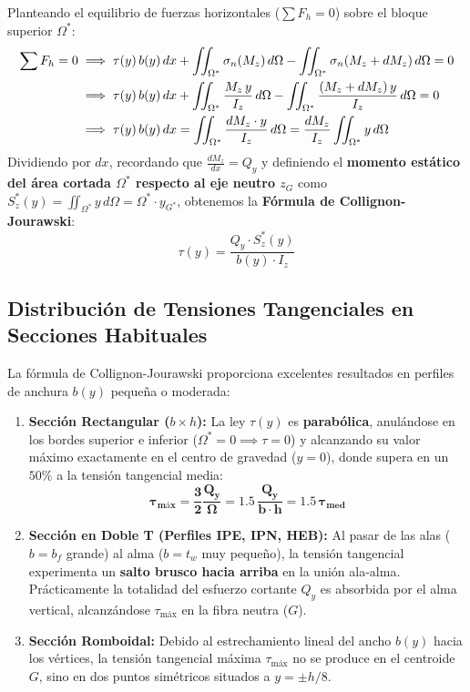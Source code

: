 Planteando el equilibrio de fuerzas horizontales ($\sum F_h = 0$) sobre el bloque superior $\Omega^*$:
\begin{align}
    \sum F_h = 0 & \implies \tau(y) \, b(y) \, dx + \iint_{\Omega^*} \sigma_n(M_z) \, d\Omega - \iint_{\Omega^*} \sigma_n(M_z + dM_z) \, d\Omega = 0 \notag                 \\
                 & \implies \tau(y) \, b(y) \, dx + \iint_{\Omega^*} \frac{M_z \, y}{I_z} \, d\Omega - \iint_{\Omega^*} \frac{(M_z + dM_z) \, y}{I_z} \, d\Omega = 0 \notag \\
                 & \implies \tau(y) \, b(y) \, dx = \iint_{\Omega^*} \frac{dM_z \cdot y}{I_z} \, d\Omega = \frac{dM_z}{I_z} \iint_{\Omega^*} y \, d\Omega
\end{align}
Dividiendo por $dx$, recordando que $\frac{dM_z}{dx} = Q_y$ y definiendo el \textbf{momento estático del área cortada $\Omega^*$ respecto al eje neutro $z_G$} como $S_z^*(y) = \iint_{\Omega^*} y \, d\Omega = \Omega^* \cdot y_{G^*}$, obtenemos la \textbf{Fórmula de Collignon-Jourawski}:
\begin{equation}
    \boxed{\tau(y) = \frac{Q_y \cdot S_z^*(y)}{b(y) \cdot I_z}}
    \label{eq:formula_collignon}
\end{equation}

\subsection{Distribución de Tensiones Tangenciales en Secciones Habituales}

La fórmula de Collignon-Jourawski proporciona excelentes resultados en perfiles de anchura $b(y)$ pequeña o moderada:
\begin{enumerate}
    \item \textbf{Sección Rectangular ($b \times h$):} La ley $\tau(y)$ es \textbf{parabólica}, anulándose en los bordes superior e inferior ($\Omega^* = 0 \implies \tau = 0$) y alcanzando su valor máximo exactamente en el centro de gravedad ($y = 0$), donde supera en un $50\%$ a la tensión tangencial media:
          \begin{equation}
              \mathbf{\tau_{\text{máx}} = \frac{3}{2} \frac{Q_y}{\Omega} = 1.5 \, \frac{Q_y}{b \cdot h} = 1.5 \, \tau_{\text{med}}}
          \end{equation}
    \item \textbf{Sección en Doble T (Perfiles IPE, IPN, HEB):} Al pasar de las alas ($b = b_f$ grande) al alma ($b = t_w$ muy pequeño), la tensión tangencial experimenta un \textbf{salto brusco hacia arriba} en la unión ala-alma. Prácticamente la totalidad del esfuerzo cortante $Q_y$ es absorbida por el alma vertical, alcanzándose $\tau_{\text{máx}}$ en la fibra neutra ($G$).
    \item \textbf{Sección Romboidal:} Debido al estrechamiento lineal del ancho $b(y)$ hacia los vértices, la tensión tangencial máxima $\tau_{\text{máx}}$ no se produce en el centroide $G$, sino en dos puntos simétricos situados a $y = \pm h/8$.
\end{enumerate}

